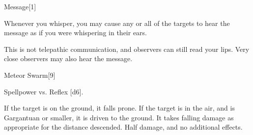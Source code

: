 \begin{spellsection}{Message}[1]
    \begin{spellheader}
    \end{spellheader}
    \begin{spellcontent}
        \begin{spelltargetinginfo}
        \end{spelltargetinginfo}
        \begin{spelleffects}
            \spelleffect Whenever you whisper, you may cause any or all of the targets to hear the message as if you were whispering in their ears.
            \spelldur \durlong
        \end{spelleffects}
    \end{spellcontent}
    \begin{spellfooter}
        \spellnotes This is not telepathic communication, and observers can still read your lips. Very close observers may also hear the message.
        \miscastexplode
    \end{spellfooter}
\end{spellsection}

\begin{spellsection}{Meteor Swarm}[9]
    \begin{spellheader}
    \end{spellheader}
    \begin{spellcontent}
        \begin{spelltargetinginfo}
            \spellrng{\rngmed}
        \end{spelltargetinginfo}
        \begin{spelleffects}
            \begin{spellattack}{Spellpower vs. Reflex}
                \spellsuccess {}[d6].

                If the target is on the ground, it falls prone. If the target is in the air, and is Gargantuan or smaller, it is driven to the ground. It takes falling damage as appropriate for the distance descended.
                \spellfailure Half damage, and no additional effects.
            \end{spellattack}
        \end{spelleffects}
    \end{spellcontent}
    \begin{spellfooter}
        \spellnotes \firespellnotes

        \destructivespellnotes
        \miscastyou
    \end{spellfooter}
\end{spellsection}

